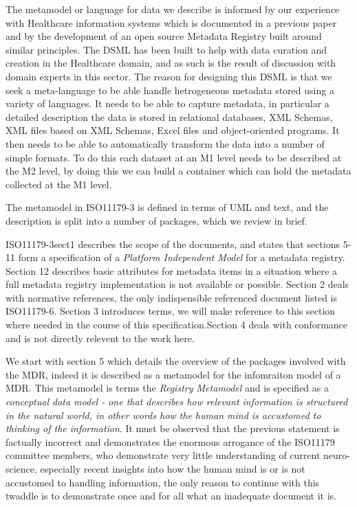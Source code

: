 \documentclass{llncs}
\begin{document}
The metamodel or language for data we describe is informed by our experience with Healthcare information systems which is documented in a previous paper \cite{DSMCR} and by the development of an open source Metadata Registry built around similar principles. The DSML has been built to help with data curation and creation in the Healthcare domain, and as such is the result of discussion with domain experts in this sector. The reason for designing this DSML is that we seek a meta-language to be able handle hetrogeneous metadata stored using a variety of languages. It needs to be able to capture metadata, in particular a detailed description the data is stored in relational databases, XML Schemas, XML files based on XML Schemas, Excel files and object-oriented programs. It then needs to be able to automatically transform the data into a number of simple formats. To do this each dataset at an M1 level needs to be described at the M2 level, by doing this we can build a container which can hold the metadata collected at the M1 level.

The metamodel in ISO11179-3 is defined in terms of UML and text, and the description is split into a number of packages, which we review in brief.
\begin{zed}

\end{zed}

ISO11179-3sect1 describes the scope of the documents, and states that sections 5-11 form a specification of a \emph{Platform Independent Model} for a metadata registry. Section 12 describes basic attributes for metadata items in a situation where a full metadata registry implementation is not available or possible. Section 2 deals with normative references, the only indispensible referenced document listed is ISO11179-6. Section 3 introduces terms, we will make reference to this section where needed in the course of this specification.Section 4 deals with conformance and is not directly relevent to the work here.

We start with section 5 which details the overview of the packages involved with the MDR, indeed it is described as a metamodel for the infomraiton model of a MDR. This metamodel is terms the \emph{Registry Metamodel} and is specified as a \emph{conceptual data model - one that describes how relevant information is structured in the natural world, in other words how the human mind is accustomed to thinking of the information}. It must be observed that the previous statement is factually incorrect and demonstrates the enormous arrogance of the ISO11179 committee members, who demonstrate very little understanding of current neuro-science, especially recent insights into how the human mind is or is not accustomed to handling information, the only reason to continue with this twaddle is to demonstrate once and for all what an inadequate document it is.
\end{document}
